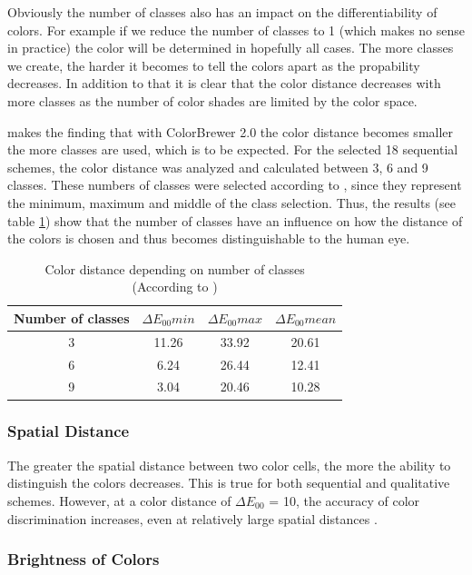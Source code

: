Obviously the number of classes also has an impact on the differentiability of colors. For example if we reduce the number of classes to 1 (which makes no sense in practice) the color will be determined in hopefully all cases. The more classes we create, the harder it becomes to tell the colors apart as the propability decreases. In addition to that it is clear that the color distance decreases with more classes as the number of color shades are limited by the color space. 

\textcite{brychtovaC2017} makes the finding that with ColorBrewer 2.0 the color distance becomes smaller the more classes are used, which is to be expected. For the selected 18 sequential schemes, the color distance was analyzed and calculated between 3, 6 and 9 classes. These numbers of classes were selected according to \textcite{brychtovaC2017}, since they represent the minimum, maximum and middle of the class selection. Thus, the results (see table \ref{tab:classes}) show that the number of classes have an influence on how the distance of the colors is chosen and thus becomes distinguishable to the human eye. 

\begin{table}[h!]
\centering
\caption[Color distance depending on number of classes]{Color distance depending on number of classes \\ (According to \textcite{brychtovaC2017})}
	\begin{tabular}{c c c c }
		\hline
		\hline
		Number of classes & $\Delta E_{00}min$ & $\Delta E_{00}max$ & $\Delta E_{00}mean$ \\ 
		\hline
		\hline
		3 & 11.26 & 33.92 & 20.61 \\  
		6 & 6.24 & 26.44 & 12.41 \\
		9 & 3.04 & 20.46 & 10.28   
	\end{tabular}
\label{tab:classes}
\end{table}

\subsubsection{Spatial Distance}
The greater the spatial distance between two color cells, the more the ability to distinguish the colors decreases. This is true for both sequential and qualitative schemes. However, at a color distance of $\Delta E_{00}$ = 10, the accuracy of color discrimination increases, even at relatively large spatial distances \parencite{brychtovaC2017}. 

\subsubsection{Brightness of Colors}

